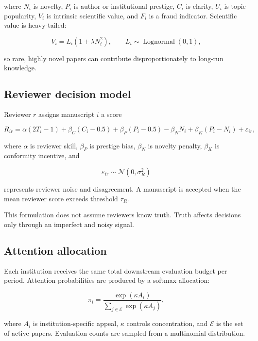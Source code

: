 \documentclass[11pt]{article}
\begin{document}
where $N_i$ is novelty, $P_i$ is author or institutional prestige, $C_i$ is clarity, $U_i$ is topic popularity, $V_i$ is intrinsic scientific value, and $F_i$ is a fraud indicator. Scientific value is heavy-tailed:

\begin{equation}
V_i = L_i\left(1+\lambda N_i^2\right),
\qquad L_i \sim \operatorname{Lognormal}(0,1),
\end{equation}

so rare, highly novel papers can contribute disproportionately to long-run knowledge.

\subsection{Reviewer decision model}

Reviewer $r$ assigns manuscript $i$ a score

\begin{equation}
R_{ir} =
\alpha(2T_i-1)
+\beta_C(C_i-0.5)
+\beta_P(P_i-0.5)
-\beta_N N_i
+\beta_K(P_i-N_i)
+\varepsilon_{ir},
\end{equation}

where $\alpha$ is reviewer skill, $\beta_P$ is prestige bias, $\beta_N$ is novelty penalty, $\beta_K$ is conformity incentive, and

\begin{equation}
\varepsilon_{ir}\sim\mathcal{N}(0,\sigma_R^2)
\end{equation}

represents reviewer noise and disagreement. A manuscript is accepted when the mean reviewer score exceeds threshold $\tau_R$.

This formulation does not assume reviewers know truth. Truth affects decisions only through an imperfect and noisy signal.

\subsection{Attention allocation}

Each institution receives the same total downstream evaluation budget per period. Attention probabilities are produced by a softmax allocation:

\begin{equation}
\pi_i = \frac{\exp(\kappa A_i)}{\sum_{j\in\mathcal{E}}\exp(\kappa A_j)},
\end{equation}

where $A_i$ is institution-specific appeal, $\kappa$ controls concentration, and $\mathcal{E}$ is the set of active papers. Evaluation counts are sampled from a multinomial distribution.
\end{document}
